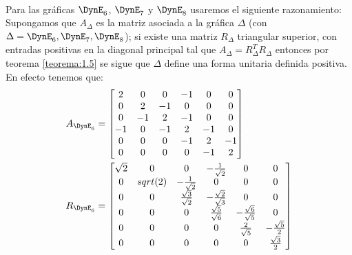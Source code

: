\paragraph{}
Para las gráficas $\DynE_{6}$, $\DynE_{7}$ y $\DynE_{8}$ usaremos el siguiente razonamiento:\\
Supongamos que $A_{\Delta}$ es la matriz asociada a la gráfica $\Delta$ (con $\Delta = \DynE_{6},\DynE_{7},\DynE_{8}$); si existe una matriz $R_{\Delta}$ triangular superior, con entradas positivas en la diagonal principal tal que $A_{\Delta} = R_{\Delta}^{T}R_{\Delta}$ entonces por teorema \ref{teorema:1.5} se sigue que $\Delta$ define una forma unitaria definida positiva.\\
En efecto tenemos que:
\begin{align*}
 A_{\DynE_{6}} &  =  \begin{bmatrix}
 2 & 0 & 0 & -1 & 0 & 0\\
 0 & 2 & -1 & 0 & 0 & 0\\
 0 & -1 & 2& -1 & 0 & 0\\
 -1 & 0 & -1 & 2 & -1 & 0\\
 0 & 0 & 0 & -1 & 2 & -1\\
 0 & 0 & 0 & 0 & -1 & 2\\
 \end{bmatrix}\\
 R_{\DynE_{6}} &  =   \begin{bmatrix}
 \sqrt{2} & 0 & 0 & -\frac{1}{\sqrt{2}} & 0 & 0\\
 0 & sqrt(2) & - \frac{1}{\sqrt{2}}& 0 & 0 & 0\\
 0 & 0 & \frac{\sqrt{3}}{\sqrt{2}} & -\frac{\sqrt{2}}{\sqrt{3}} & 0 & 0\\
 0 & 0 & 0 & \frac{\sqrt{5}}{\sqrt{6}} & -\frac{\sqrt{6}}{\sqrt{5}} & 0\\
 0 & 0 & 0 & 0 & \frac{2}{\sqrt{5}} & -\frac{\sqrt{5}}{2}\\
 0 & 0 & 0 & 0 & 0 & \frac{\sqrt{3}}{2}\\
 \end{bmatrix}
 \end{align*}\\
